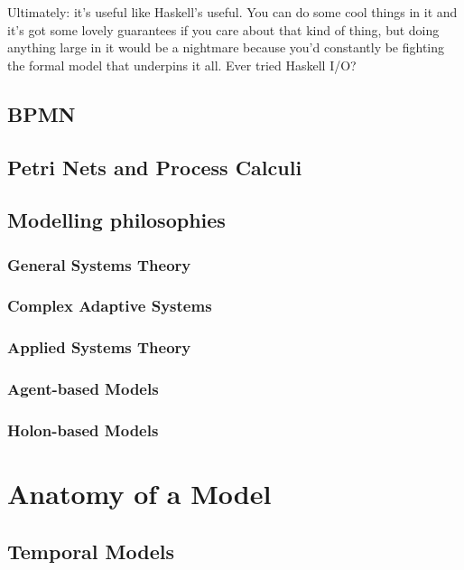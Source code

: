 \documentclass{article}
\begin{document}
Ultimately: it's useful like Haskell's useful. You can do some cool things in it and it's got some lovely guarantees if
you care about that kind of thing, but doing anything large in it would be a nightmare because you'd constantly be
fighting the formal model that underpins it all. Ever tried Haskell I/O?\par

\subsection{BPMN}

\subsection{Petri Nets and Process Calculi}

\subsection{Modelling philosophies}

\subsubsection{General Systems Theory}
\subsubsection{Complex Adaptive Systems}
\subsubsection{Applied Systems Theory}
\subsubsection{Agent-based Models}
\subsubsection{Holon-based Models}


\section{Anatomy of a Model}

\subsection{Temporal Models}
\end{document}
